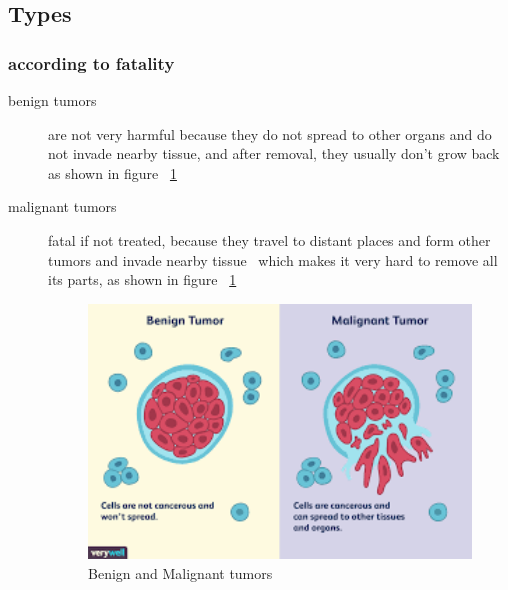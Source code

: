 \subsection{Types}
        \subsubsection{according to fatality}
        \begin{description}
            \item[benign tumors]
            are not very harmful because they do not spread to other organs and do not invade nearby tissue, and after removal, they usually don't grow back~\cite{whatiscancer2021} as shown in figure ~\ref{fig:benignMalignant}
            \item[malignant tumors]
            fatal if not treated, because they travel to distant places and form other tumors and invade nearby tissue~\cite{whatiscancer2021} which makes it very hard to remove all its parts, as shown in figure ~\ref{fig:benignMalignant}
\begin{figure}[htbp]
\begin{center}
\includegraphics[width=15cm]{./chapter-01-general-medical-information/benign-malignant.png}
\end{center}
\caption{Benign and Malignant tumors  ~\cite{benignMalignant}}
\label{fig:benignMalignant}
\end{figure}
        \end{description}
